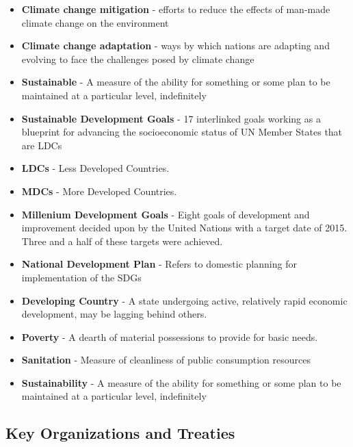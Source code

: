 \documentclass[10pt, letterpaper]{article}
\begin{document}
\begin{itemize}
\item \textbf{Climate change mitigation} - efforts to reduce the effects of man-made
climate change on the environment

\item \textbf{Climate change adaptation} - ways by which nations are adapting and
evolving to face the challenges posed by climate change

\item \textbf{Sustainable} - A measure of the ability for something or some plan to be
maintained at a particular level, indefinitely

\item \textbf{Sustainable Development Goals} - 17 interlinked goals working as a
blueprint for advancing the socioeconomic status of UN Member States
that are LDCs

\item \textbf{LDCs} - Less Developed Countries.

\item \textbf{MDCs} - More Developed Countries.

\item \textbf{Millenium Development Goals} - Eight goals of development and improvement
decided upon by the United Nations with a target date of 2015. Three and
a half of these targets were achieved.

\item \textbf{National Development Plan} - Refers to domestic planning for
implementation of the SDGs

\item \textbf{Developing Country} - A state undergoing active, relatively rapid
economic development, may be lagging behind others.

\item \textbf{Poverty} - A dearth of material possessions to provide for basic needs.

\item \textbf{Sanitation} - Measure of cleanliness of public consumption resources

\item \textbf{Sustainability} - A measure of the ability for something or some plan to
be maintained at a particular level, indefinitely

\end{itemize}

\subsection{Key Organizations and Treaties}
\end{document}
